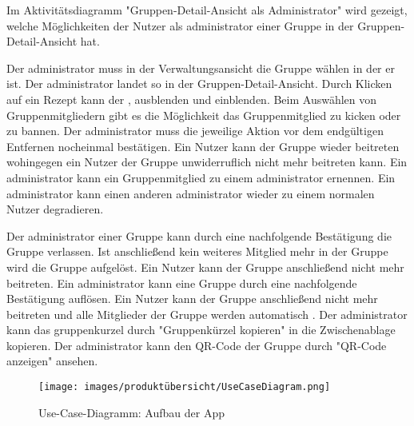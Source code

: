 \documentclass[parskip=full]{scrartcl}
\begin{document}
Im Aktivitätsdiagramm "Gruppen-Detail-Ansicht als Administrator" wird gezeigt, welche Möglichkeiten der Nutzer als \gls{administrator} einer Gruppe in der Gruppen-Detail-Ansicht hat.

Der \gls{administrator} muss in der Verwaltungsansicht die Gruppe wählen in der er  ist.
Der \gls{administrator} landet so in der Gruppen-Detail-Ansicht.
Durch Klicken auf ein Rezept kann der ,   \gls{ausblenden} und   \gls{einblenden}.\newline
Beim Auswählen von Gruppenmitgliedern gibt es die Möglichkeit das Gruppenmitglied zu \gls{kicken} oder zu \gls{bannen}.
Der \gls{administrator} muss die jeweilige Aktion vor dem endgültigen Entfernen nocheinmal bestätigen.
Ein  Nutzer kann der Gruppe wieder beitreten wohingegen ein  Nutzer der Gruppe unwiderruflich nicht mehr beitreten kann.
Ein \gls{administrator} kann ein Gruppenmitglied zu einem \gls{administrator} ernennen.
Ein \gls{administrator} kann einen anderen \gls{administrator} wieder zu einem normalen Nutzer degradieren.

Der \gls{administrator} einer Gruppe kann durch eine nachfolgende Bestätigung die Gruppe verlassen.
Ist anschließend kein weiteres Mitglied mehr in der Gruppe wird die Gruppe aufgelöst. Ein Nutzer kann der Gruppe anschließend nicht mehr beitreten.
Ein \gls{administrator} kann eine Gruppe durch eine nachfolgende Bestätigung auflösen. Ein Nutzer kann der Gruppe anschließend nicht mehr beitreten und alle Mitglieder der Gruppe werden automatisch .\newline
Der \gls{administrator} kann das \gls{gruppenkurzel} durch "Gruppenkürzel kopieren" in die Zwischenablage kopieren. Der \gls{administrator} kann den QR-Code der Gruppe durch "QR-Code anzeigen" ansehen.

\newpage

\begin{figure}[!htp]
    \centering
    \begin{adjustbox}{right=160mm}
        \texttt{[image: images/produktübersicht/UseCaseDiagram.png]}
    \end{adjustbox}
    \caption{Use-Case-Diagramm: Aufbau der App}
    \label{fig:UseCaseDiagram}
\end{figure}
\newpage
\end{document}
